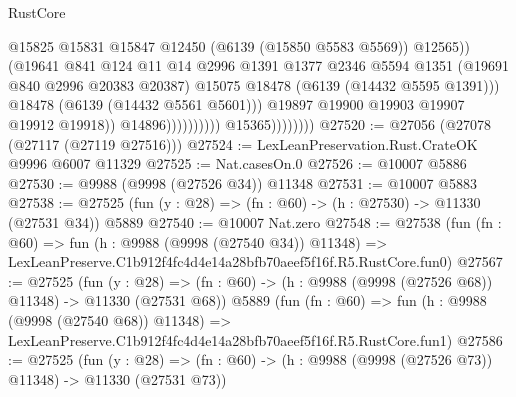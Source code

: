 \begin{lexlean}{RustCore}
\begin{coremodule}
                                                  @15825
                                                  @15831
                                                  @15847
                                                  @12450
                                                  (@6139 (@15850 @5583 @5569))
                                                  @12565))
                                              (@19641
                                                @841
                                                @124
                                                @11
                                                @14
                                                @2996
                                                @1391
                                                @1377
                                                @2346
                                                @5594
                                                @1351
                                                (@19691 @840 @2996 @20383 @20387)
                                                @15075
                                                @18478
                                                (@6139 (@14432 @5595 @1391)))
                                              @18478
                                              (@6139 (@14432 @5561 @5601)))
                                            @19897
                                            @19900
                                            @19903
                                            @19907
                                            @19912
                                            @19918))
                                        @14896))))))))))
                    @15365))))))))
@27520 := @27056 (@27078 (@27117 (@27119 @27516)))
@27524 := LexLeanPreservation.Rust.CrateOK @9996 @6007 @11329
@27525 := Nat.casesOn.{0}
@27526 := @10007 @5886
@27530 := @9988 (@9998 (@27526 @34)) @11348
@27531 := @10007 @5883
@27538 := @27525 (fun (y : @28) => (fn : @60) -> (h : @27530) -> @11330 (@27531 @34)) @5889
@27540 := @10007 Nat.zero
@27548 := @27538
    (fun (fn : @60) =>
    fun (h : @9988 (@9998 (@27540 @34)) @11348) =>
    LexLeanPreserve.C1b912f4fc4d4e14a28bfb70aeef5f16f.R5.RustCore.fun0)
@27567 := @27525
    (fun (y : @28) => (fn : @60) -> (h : @9988 (@9998 (@27526 @68)) @11348) -> @11330 (@27531 @68))
    @5889
    (fun (fn : @60) =>
    fun (h : @9988 (@9998 (@27540 @68)) @11348) =>
    LexLeanPreserve.C1b912f4fc4d4e14a28bfb70aeef5f16f.R5.RustCore.fun1)
@27586 := @27525
    (fun (y : @28) => (fn : @60) -> (h : @9988 (@9998 (@27526 @73)) @11348) -> @11330 (@27531 @73))

\end{coremodule}
\end{lexlean}
